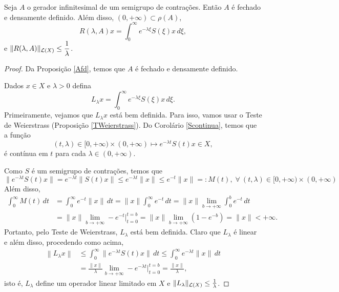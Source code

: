 \begin{lemma}
Seja $A$ o gerador infinitesimal de um semigrupo de contrações. Então $A$ é fechado e densamente definido. Além disso, $(0,+\infty)\subset \rho(A)$, 
\[R(\lambda,A)x=\displaystyle\int_0^\infty e^{-\lambda \xi}S(\xi)x\, d\xi,\] 
e $\|R(\lambda, A)\|_{\mathcal{L}(X)}\leq \displaystyle\frac{1}{\lambda}$.
\end{lemma}
\begin{proof} Da Proposição \ref{Afd}, temos que $A$ é fechado e densamente definido.

Dados $x\in X$ e $\lambda>0$ defina
\begin{equation*}
L_\lambda x =\int_0^\infty e^{-\lambda \xi}S(\xi)x\, d\xi.
\end{equation*}
Primeiramente, vejamos que $L_\lambda x$ está bem definida. 
Para isso, vamos usar o Teste de Weierstrass
(Proposição \ref{TWeierstrass}). Do Corolário \ref{Scontinua}, temos que a função
\begin{equation*}
(t,\lambda)\in [0,+\infty)\times (0,+\infty)\longmapsto e^{-\lambda t}S(t)x\in  X,
\end{equation*}
é contínua em $t$ para cada $\lambda\in (0,+\infty)$. 

Como $S$ é um semigrupo de contrações, temos que
\begin{equation*}
\|e^{-\lambda t}S(t)x\| =e^{-\lambda t}\|S(t)x\|\leq e^{-\lambda t}\|x\|
\leq e^{-t}\|x\| =:M(t), 
\; \forall\ (t,\lambda)\in [0,+\infty)\times (0,+\infty)
\end{equation*}
Além disso, 
\begin{align*}
 \int_0^\infty M(t)\, dt& =\int_0^\infty e^{-t}\|x\|\, dt
=\|x\| \int_0^\infty e^{- t}\, dt 
=\|x\|\lim_{b\to +\infty} \int_0^b e^{-t}\, dt\\
& =\|x\|\lim_{b\to +\infty}-e^{-t}\Big\vert_{t=0}^{t=b} =\|x\|\lim_{b\to +\infty}\left(1-e^{-b}\right)={\|x\|}<+\infty.
\end{align*}
Portanto, pelo Teste de Weierstrass, $L_\lambda$ está bem definida. Claro que $L_\lambda$ é linear e além disso, procedendo como acima, 
\begin{align*}
\left\|L_\lambda x\right\|& \leq \int_0^\infty\|e^{-\lambda t}S(t)x\|\,dt\leq
\int_0^\infty e^{-\lambda t}\|x\|\,dt\\
& = \frac{\|x\|}{\lambda}\lim_{b\to +\infty}-e^{-\lambda t}\Big\vert_{t=0}^{t=b}
=\frac{\|x\|}{\lambda},
\end{align*}
isto é, $L_\lambda$ define um operador linear limitado em $X$ e 
$\|L_\lambda\|_{\mathcal{L}(X)}\leq \frac{1}{\lambda}$.


\end{proof}
